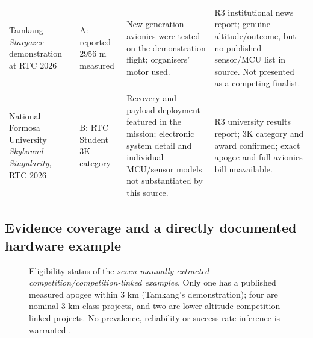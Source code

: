 \documentclass[10pt,a4paper]{article}
\begin{document}
\begin{longtable}{@{}L{30mm}L{22mm}L{51mm}L{39mm}@{}}
Tamkang \emph{Stargazer} demonstration at RTC 2026 \cite{stargazer2026} & A: reported 2956 m measured & New-generation avionics were tested on the demonstration flight; organisers' motor used. & R3 institutional news report; genuine altitude/outcome, but no published sensor/MCU list in source. Not presented as a competing finalist.\\
National Formosa University \emph{Skybound Singularity}, RTC 2026 \cite{nfu2026} & B: RTC Student 3K category & Recovery and payload deployment featured in the mission; electronic system detail and individual MCU/sensor models not substantiated by this source. & R3 university results report; 3K category and award confirmed; exact apogee and full avionics bill unavailable.\\
\end{longtable}
\normalsize


\subsection{Evidence coverage and a directly documented hardware example}
\begin{figure}[htbp]\centering
{}
\caption{Eligibility status of the \emph{seven manually extracted competition/competition-linked examples}. Only one has a published measured apogee within 3 km (Tamkang's demonstration); four are nominal 3-km-class projects, and two are lower-altitude competition-linked projects. No prevalence, reliability or success-rate inference is warranted \cite{stargazer2026,astg2021aves,astg2022aves2,zlamala2024,nfu2026,zapadlo2023,kadlec2024}.}
\label{fig:classes}
\end{figure}
\end{document}
